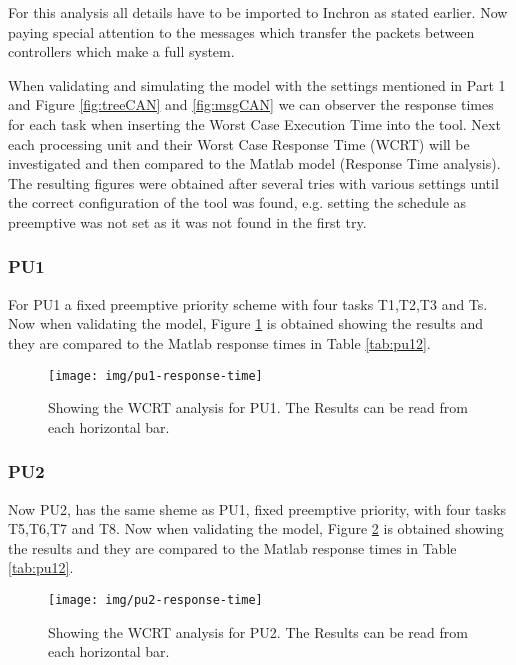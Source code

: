 For this analysis all details have to be imported to Inchron as stated earlier. Now paying special attention to the messages which transfer the packets between controllers which make a full system. 

When validating and simulating the model with the settings mentioned in Part 1 and Figure \ref{fig:treeCAN} and \ref{fig:msgCAN} we can observer the response times for each task when inserting the Worst Case Execution Time into the tool. Next each processing unit and their Worst Case Response Time (WCRT) will be investigated and then compared to the Matlab model (Response Time analysis). The resulting figures were obtained after several tries with various settings until the correct configuration of the tool was found, e.g. setting the schedule as preemptive was not set as it was not found in the first try.

\subsubsection{PU1}

For PU1 a fixed preemptive priority scheme with four tasks T1,T2,T3 and Ts. Now when validating the model, Figure \ref{fig:pu1rt} is obtained showing the results and they are compared to the Matlab response times in Table \ref{tab:pu12}.

\begin{figure}[h!]
	\begin{center}
		\texttt{[image: img/pu1-response-time]}
		\caption{Showing the WCRT analysis for PU1. The Results can be read from each horizontal bar.}
		\label{fig:pu1rt}
	\end{center}
\end{figure}

\subsubsection{PU2}
Now PU2, has the same sheme as PU1, fixed preemptive priority, with four tasks T5,T6,T7 and T8. Now when validating the model, Figure \ref{fig:pu2rt} is obtained showing the results and they are compared to the Matlab response times in Table \ref{tab:pu12}.

\begin{figure}[h!]
	\begin{center}
		\texttt{[image: img/pu2-response-time]}
		\caption{Showing the WCRT analysis for PU2. The Results can be read from each horizontal bar.}
		\label{fig:pu2rt}
	\end{center}
\end{figure}

